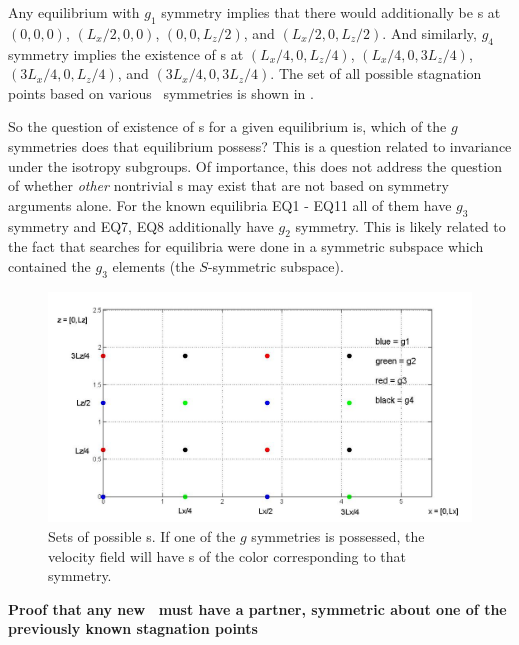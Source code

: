 \documentclass[letter,10pt,openany]{article}
\begin{document}
 Any equilibrium with $g_1$ symmetry implies that there would additionally be \stagp s at $(0,0,0)$, $(L_{x}/2,0,0)$, $(0,0,L_{z}/2)$, and
$(L_{x}/2,0,L_{z}/2)$. And similarly, $g_4$ symmetry implies the existence of
\stagp s at $(L_{x}/4,0,L_{z}/4)$, $(L_{x}/4,0,3L_{z}/4)$,
$(3L_{x}/4,0,L_{z}/4)$, and $(3L_{x}/4,0,3L_{z}/4)$. The set of all possible stagnation points based on various \pCf\ symmetries
 is shown in .

So the question of existence of \stagp s for a given equilibrium is, which of the
$g$ symmetries does that equilibrium possess? This is a question related to
invariance under the isotropy subgroups. Of importance, this does not
address the question of whether \textit{other} nontrivial \stagp s may exist that are not based on symmetry arguments alone. For the known equilibria EQ1 - EQ11 all of
them have $g_3$ symmetry and EQ7, EQ8 additionally have $g_2$ symmetry. This is likely related to the fact that searches for
equilibria were done in a symmetric subspace which contained the
$g_3$ elements (the $S$-symmetric subspace).


\begin{figure}[!h]
\includegraphics[width=1.0\textwidth]{stags7_26.jpg}
  \caption{
   Sets of possible \stagp s. If one of the $g$ symmetries is
   possessed, the velocity field will have \stagp s of the color
   corresponding to that symmetry.
   }
  \label{eltonFig:stags7_26}
 \end{figure}



\begin{large}
\noindent \textbf{Proof that any new \stagp\ must have a partner, symmetric about one of the previously known stagnation points} \\
\end{large}
\end{document}
